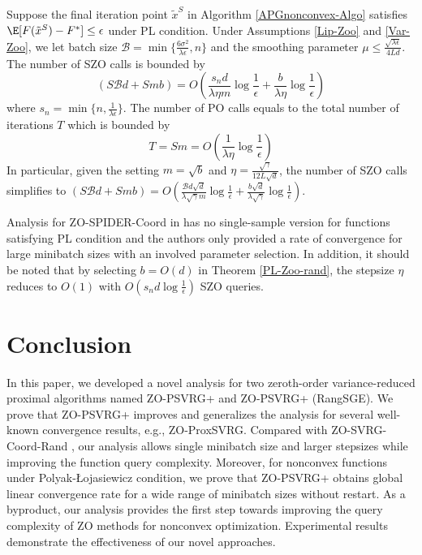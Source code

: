 \begin{corollary}\label{PL-Zo-Cor-rand}
Suppose the final iteration point $\tilde{x}^S$ in Algorithm \ref{APGnonconvex-Algo} satisfies $\E[F(\tilde{x}^S) - F^*]\leq \epsilon$ under PL condition. Under Assumptions \ref{Lip-Zoo} and \ref{Var-Zoo}, we let batch size $\mathcal{B} = \min\{\frac{6\sigma^2}{\lambda\epsilon},n\}$ and the smoothing parameter $\mu \leq \frac{\sqrt{\lambda\epsilon}}{4 L d}$. The number of SZO calls is bounded by
\[
(S\mathcal{B}d+Smb) = O(\frac{s_n d}{\lambda\eta m}\log\frac{1}{\epsilon}+\frac{b }{\lambda\eta}\log\frac{1}{\epsilon})
\]
where $s_n = \min \{n,\frac{1}{\lambda \epsilon}\}$.
The number of PO calls equals to the total number of iterations $T$ which is bounded by
\[
T = Sm = O(\frac{1}{\lambda\eta}\log\frac{1}{\epsilon})
\]
In particular, given the setting  $m=\sqrt{b}$ and $\eta = \frac{\sqrt{\gamma}}{12 L\sqrt{d}}$, the number of SZO calls  simplifies to 
$(S\mathcal{B}d+Smb) = O(\frac{\mathcal{B}d\sqrt{d}}{\lambda\sqrt{\gamma} m}\log\frac{1}{\epsilon}+\frac{b\sqrt{d}}{\lambda\sqrt{\gamma}}\log\frac{1}{\epsilon})$.
\end{corollary}

\begin{remark}
Analysis for ZO-SPIDER-Coord in \cite{ji2019improved} has no single-sample version for functions satisfying PL condition and the authors only provided a rate of convergence for large minibatch sizes with an involved parameter selection. In addition, it should be noted that by selecting  $b = O(d)$ in Theorem \ref{PL-Zoo-rand}, the stepsize $\eta$ reduces to $O(1)$ with $O(s_n d \log \frac{1}{\epsilon})$ SZO queries. 
\end{remark}

\section{Conclusion}
In this paper, we developed a novel analysis for two zeroth-order variance-reduced proximal algorithms named 
ZO-PSVRG+ and ZO-PSVRG+ (RangSGE). We prove that ZO-PSVRG+ improves and generalizes the analysis for several well-known convergence
results, e.g., ZO-ProxSVRG. Compared with ZO-SVRG-Coord-Rand \cite{ji2019improved}, our analysis allows single minibatch size and larger
stepsizes while improving the function query complexity. Moreover, for nonconvex functions under Polyak-Łojasiewicz condition, we prove that ZO-PSVRG+
obtains global linear convergence rate for a wide range of minibatch sizes without restart.  As a byproduct, our analysis provides the first step towards improving the query complexity of ZO methods for nonconvex optimization. Experimental results demonstrate the effectiveness of our novel approaches.
